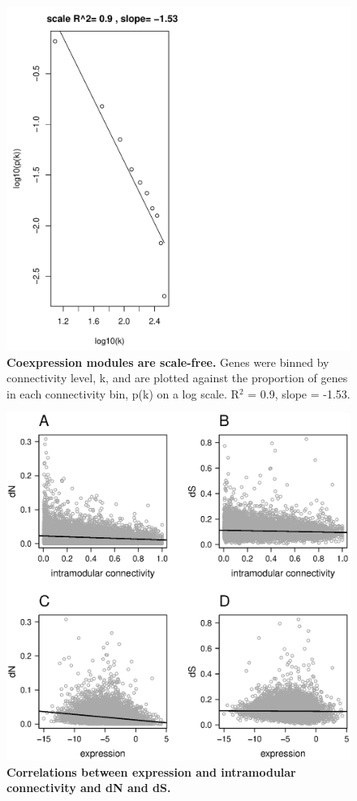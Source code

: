 \begin{figure}[ht!]
      \centering
       \includegraphics[width=\linewidth]{ScaleFree}
    \caption{\textbf{Coexpression modules are scale-free.} Genes were binned by connectivity level, k, and are plotted against the proportion of genes in each connectivity bin, p(k) on a log scale. R$^{2}$ = 0.9, slope = -1.53.}
    \label{fig:fsScale}
\end{figure}


\begin{figure}[ht!]
      \centering
       \includegraphics[width=\linewidth]{Ch4FigCorr}
    \caption{\textbf{Correlations between expression and intramodular connectivity and dN and dS.}}
    \label{fig:fsCorr}
\end{figure}


